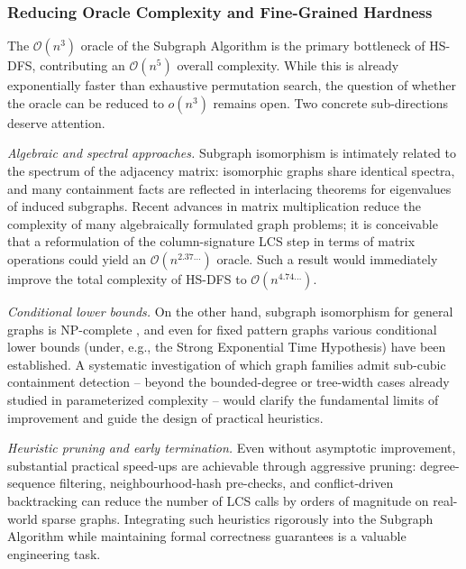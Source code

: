 ﻿\documentclass[12pt,a4paper]{article}
\theoremstyle{plain}
\theoremstyle{definition}
\theoremstyle{remark}
\begin{document}
	\subsubsection*{Reducing Oracle Complexity and Fine-Grained Hardness}

	The $\mathcal{O}(n^3)$ oracle of the Subgraph Algorithm
	\cite{epp2026subgraph} is the primary bottleneck of HS-DFS, contributing
	an $\mathcal{O}(n^5)$ overall complexity.  While this is already
	exponentially faster than exhaustive permutation search, the question of
	whether the oracle can be reduced to $o(n^3)$ remains open.  Two concrete
	sub-directions deserve attention.

	\emph{Algebraic and spectral approaches.}  Subgraph isomorphism is intimately
	related to the spectrum of the adjacency matrix: isomorphic graphs share
	identical spectra, and many containment facts are reflected in interlacing
	theorems for eigenvalues of induced subgraphs.  Recent advances in matrix
	multiplication \cite{williams2018} reduce the complexity of many
	algebraically formulated graph problems; it is conceivable that a
	reformulation of the column-signature LCS step in terms of matrix operations
	could yield an $\mathcal{O}(n^{2.37\ldots})$ oracle.  Such a result would
	immediately improve the total complexity of HS-DFS to
	$\mathcal{O}(n^{4.74\ldots})$.

	\emph{Conditional lower bounds.}  On the other hand, subgraph isomorphism
	for general graphs is NP-complete \cite{cook1971}, and even for fixed
	pattern graphs various conditional lower bounds (under, e.g., the
	Strong Exponential Time Hypothesis) have been established.  A systematic
	investigation of which graph families admit sub-cubic containment
	detection -- beyond the bounded-degree or tree-width cases already
	studied in parameterized complexity -- would clarify the fundamental
	limits of improvement and guide the design of practical heuristics.

	\emph{Heuristic pruning and early termination.}  Even without asymptotic
	improvement, substantial practical speed-ups are achievable through
	aggressive pruning: degree-sequence filtering, neighbourhood-hash
	pre-checks, and conflict-driven backtracking can reduce the number of
	LCS calls by orders of magnitude on real-world sparse graphs.  Integrating
	such heuristics rigorously into the Subgraph Algorithm while maintaining
	formal correctness guarantees is a valuable engineering task.

\end{document}

